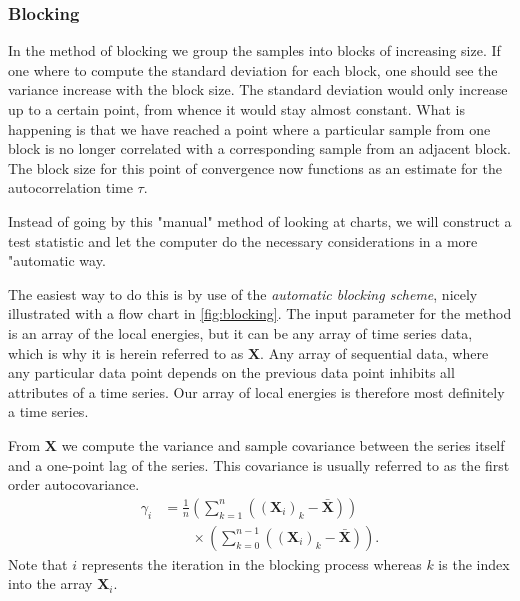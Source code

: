 \documentclass[
    a4paper, aps, twocolumn, floatfix, superscriptaddress,
    nofootinbib]{revtex4-1}
\newcommand{\1}{\mathds{1}}
\begin{document}
        \subsubsection{Blocking}
            In the method of blocking we group the samples into blocks of
            increasing size. If one where to compute the standard deviation for
            each block, one should see the variance increase with the block
            size.  The standard deviation would only increase up to a certain
            point, from whence it would stay almost constant. What is happening
            is that we have reached a point where a particular sample from one
            block is no longer correlated with a corresponding sample from an
            adjacent block.  The block size for this point of convergence now
            functions as an estimate for the autocorrelation time $\tau$.

            Instead of going by this "manual" method of looking at charts, we
            will construct a test statistic and let the computer do the
            necessary considerations in a more "automatic way.

            The easiest way to do this is by use of the \emph{automatic blocking
            scheme}, nicely illustrated with a flow chart in
            \autoref{fig:blocking}. The input parameter for the method is an
            array of the local energies, but it can be any array of time series
            data, which is why it is herein referred to as $\mathbf{X}$. Any
            array of sequential data, where any particular data point depends on
            the previous data point inhibits all attributes of a time series.
            Our array of local energies is therefore most definitely a time
            series.

            From $\mathbf{X}$ we compute the variance and sample covariance
            between the series itself and a one-point lag of the series. This
            covariance is usually referred to as the first order autocovariance.
            \begin{align}
                \gamma_i
                &= \frac{1}{n}
                \left(
                    \sum_{k=1}^n
                    \left((\mathbf{X}_i)_k - \bar{\mathbf{X}}\right)
                \right)
                \nonumber \\
                &\qquad
                \times
                \left(
                    \sum_{k=0}^{n-1}
                    \left((\mathbf{X}_i)_k - \bar{\mathbf{X}}\right)
                \right).
            \end{align}
            Note that $i$ represents the iteration in the blocking process
            whereas $k$ is the index into the array $\mathbf{X}_i$.
\end{document}
